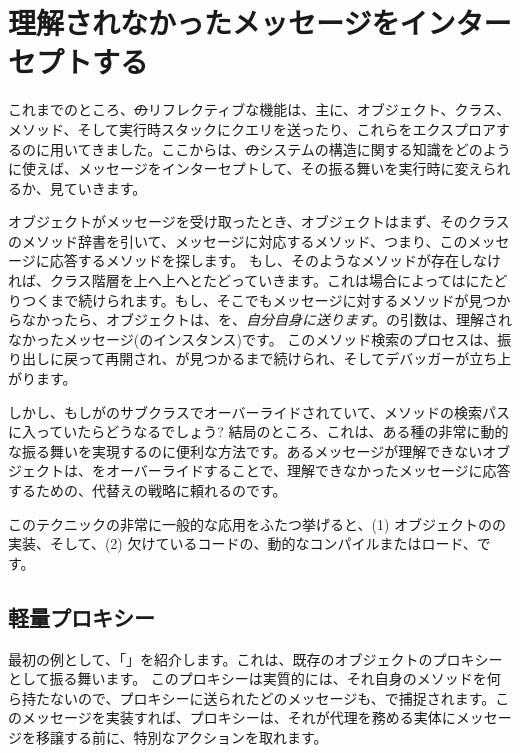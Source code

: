\documentclass[a4paper,10pt,twoside]{book}
\begin{document}
\section{理解されなかったメッセージをインターセプトする}

これまでのところ、\st のリフレクティブな機能は、主に、オブジェクト、クラス、メソッド、そして実行時スタックにクエリを送ったり、これらをエクスプロアするのに用いてきました。ここからは、\st のシステムの構造に関する知識をどのように使えば、メッセージをインターセプトして、その振る舞いを実行時に変えられるか、見ていきます。

オブジェクトがメッセージを受け取ったとき、オブジェクトはまず、そのクラスのメソッド辞書を引いて、メッセージに対応するメソッド、つまり、このメッセージに応答するメソッドを探します。
もし、そのようなメソッドが存在しなければ、クラス階層を上へ上へとたどっていきます。これは場合によってはにたどりつくまで続けられます。もし、そこでもメッセージに対するメソッドが見つからなかったら、オブジェクトは、を、\emph{自分自身に送ります}。の引数は、理解されなかったメッセージ(のインスタンス)です。
このメソッド検索のプロセスは、振り出しに戻って再開され、が見つかるまで続けられ、そしてデバッガーが立ち上がります。

しかし、もしがのサブクラスでオーバーライドされていて、メソッドの検索パスに入っていたらどうなるでしょう?
結局のところ、これは、ある種の非常に動的な振る舞いを実現するのに便利な方法です。あるメッセージが理解できないオブジェクトは、をオーバーライドすることで、理解できなかったメッセージに応答するための、代替えの戦略に頼れるのです。

このテクニックの非常に一般的な応用をふたつ挙げると、(1) オブジェクトのの実装、そして、(2) 欠けているコードの、動的なコンパイルまたはロード、です。

\subsection{軽量プロキシー}

最初の例として、「」を紹介します。これは、既存のオブジェクトのプロキシーとして振る舞います。
このプロキシーは実質的には、それ自身のメソッドを何ら持たないので、プロキシーに送られたどのメッセージも、で捕捉されます。このメッセージを実装すれば、プロキシーは、それが代理を務める実体にメッセージを移譲する前に、特別なアクションを取れます。
\end{document}
